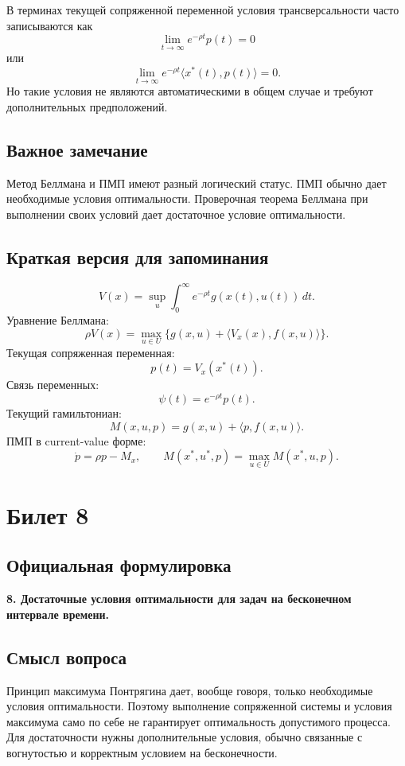 \documentclass[12pt,a4paper]{article}
\begin{document}
В терминах текущей сопряженной переменной условия трансверсальности часто записываются как
\[
    \lim_{t\to\infty}e^{-\rho t}p(t)=0
\]
или
\[
    \lim_{t\to\infty}e^{-\rho t}\langle x^*(t),p(t)\rangle=0.
\]
Но такие условия не являются автоматическими в общем случае и требуют дополнительных предположений.

\subsection{Важное замечание}

Метод Беллмана и ПМП имеют разный логический статус. ПМП обычно дает необходимые условия оптимальности. Проверочная теорема Беллмана при выполнении своих условий дает достаточное условие оптимальности.

\subsection{Краткая версия для запоминания}

\[
    V(x)=\sup_u\int_0^\infty e^{-\rho t}g(x(t),u(t))\,dt.
\]
Уравнение Беллмана:
\[
    \rho V(x)=\max_{u\in U}\{g(x,u)+\langle V_x(x),f(x,u)\rangle\}.
\]
Текущая сопряженная переменная:
\[
    p(t)=V_x(x^*(t)).
\]
Связь переменных:
\[
    \psi(t)=e^{-\rho t}p(t).
\]
Текущий гамильтониан:
\[
    M(x,u,p)=g(x,u)+\langle p,f(x,u)\rangle.
\]
ПМП в current-value форме:
\[
    \dot p=\rho p-M_x,
    \qquad
    M(x^*,u^*,p)=\max_{u\in U}M(x^*,u,p).
\]

\newpage

\section{Билет 8}

\subsection*{Официальная формулировка}

\textbf{8. Достаточные условия оптимальности для задач на бесконечном интервале времени.}

\subsection{Смысл вопроса}

Принцип максимума Понтрягина дает, вообще говоря, только необходимые условия оптимальности. Поэтому выполнение сопряженной системы и условия максимума само по себе не гарантирует оптимальность допустимого процесса. Для достаточности нужны дополнительные условия, обычно связанные с вогнутостью и корректным условием на бесконечности.
\end{document}

